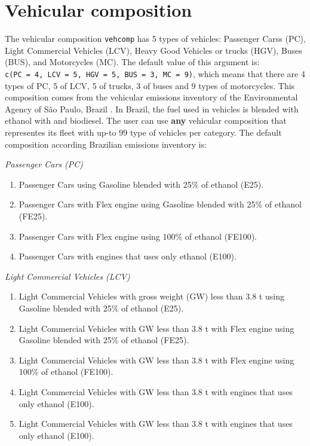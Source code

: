 \documentclass[12pt,graybox,envcountchap,sectrefs]{krantz}
\providecommand{\tightlist}{%
  \setlength{\itemsep}{0pt}\setlength{\parskip}{0pt}}
\theoremstyle{definition}
\theoremstyle{definition}
\theoremstyle{definition}
\theoremstyle{remark}
\begin{document}
\section{\texorpdfstring{Vehicular composition
\citep{CETESB2015}}{Vehicular composition {[}@CETESB2015{]}}}\label{vehicular-composition-cetesb2015}

The vehicular composition \texttt{vehcomp} has 5 types of vehicles:
Passenger Carss (PC), Light Commercial Vehicles (LCV), Heavy Good
Vehicles or trucks (HGV), Buses (BUS), and Motorcycles (MC). The default
value of this argument is:
\texttt{c(PC\ =\ 4,\ LCV\ =\ 5,\ HGV\ =\ 5,\ BUS\ =\ 3,\ MC\ =\ 9)},
which means that there are 4 types of PC, 5 of LCV, 5 of trucks, 3 of
buses and 9 types of motorcycles. This composition comes from the
vehicular emissions inventory of the Environmental Agency of São Paulo,
Brazil \citep{CETESB2015}. In Brazil, the fuel used in vehicles is
blended with ethanol with and biodiesel. The user can use \textbf{any}
vehicular composition that representes its fleet with up-to 99 type of
vehicles per category. The default composition according Brazilian
emissions inventory is:

\emph{Passenger Cars (PC)}

\begin{enumerate}
\def\labelenumi{\arabic{enumi}.}
\tightlist
\item
  Passenger Cars using Gasoline blended with 25\% of ethanol (E25).
\item
  Passenger Cars with Flex engine using Gasoline blended with 25\% of
  ethanol (FE25).
\item
  Passenger Cars with Flex engine using 100\% of ethanol (FE100).
\item
  Passenger Cars with engines that uses only ethanol (E100).
\end{enumerate}

\emph{Light Commercial Vehicles (LCV)}

\begin{enumerate}
\def\labelenumi{\arabic{enumi}.}
\tightlist
\item
  Light Commercial Vehicles with gross weight (GW) less than 3.8 t using
  Gasoline blended with 25\% of ethanol (E25).
\item
  Light Commercial Vehicles with GW less than 3.8 t with Flex engine
  using Gasoline blended with 25\% of ethanol (FE25).
\item
  Light Commercial Vehicles with GW less than 3.8 t with Flex engine
  using 100\% of ethanol (FE100).
\item
  Light Commercial Vehicles with GW less than 3.8 t with engines that
  uses only ethanol (E100).
\item
  Light Commercial Vehicles with GW less than 3.8 t with engines that
  uses only ethanol (E100).
\end{enumerate}
\end{document}
